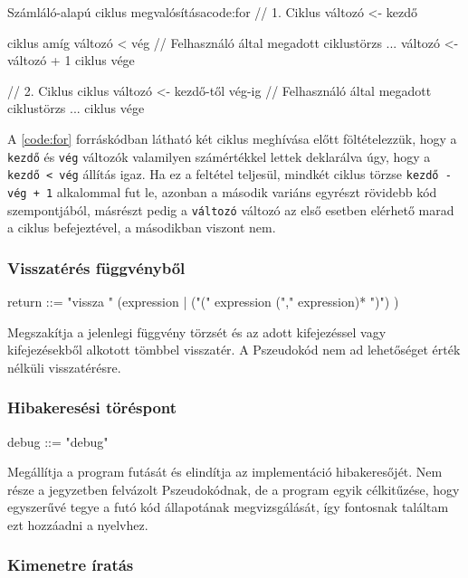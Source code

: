 \begin{code}{Számláló-alapú ciklus megvalósítása}{code:for}
// 1. Ciklus
változó <- kezdő

ciklus amíg változó < vég
    // Felhasználó által megadott ciklustörzs ...
    változó <- változó + 1
ciklus vége

// 2. Ciklus
ciklus változó <- kezdő-től vég-ig
    // Felhasználó által megadott ciklustörzs ...
ciklus vége
\end{code}

A \ref{code:for} forráskódban látható két ciklus meghívása előtt föltételezzük, hogy a \texttt{kezdő} és \texttt{vég} változók valamilyen számértékkel lettek deklarálva úgy, hogy a \texttt{kezdő < vég} állítás igaz. Ha ez a feltétel teljesül, mindkét ciklus törzse \texttt{kezdő - vég + 1} alkalommal fut le, azonban a második variáns egyrészt rövidebb kód szempontjából, másrészt pedig a \texttt{változó} változó az első esetben elérhető marad a ciklus befejeztével, a másodikban viszont nem.

\subsubsection{Visszatérés függvényből}

\begin{ebnf}
return ::= "vissza " (expression | ("(" expression ("," expression)* ")") ) 
\end{ebnf}

Megszakítja a jelenlegi függvény törzsét és az adott kifejezéssel vagy kifejezésekből alkotott tömbbel visszatér. A Pszeudokód nem ad lehetőséget érték nélküli visszatérésre.

\subsubsection{Hibakeresési töréspont}

\begin{ebnf}
debug ::= "debug"
\end{ebnf}

Megállítja a program futását és elindítja az implementáció hibakeresőjét. Nem része a jegyzetben felvázolt Pszeudokódnak, de a program egyik célkitűzése, hogy egyszerűvé tegye a futó kód állapotának megvizsgálását, így fontosnak találtam ezt hozzáadni a nyelvhez.

\subsubsection{Kimenetre íratás}

